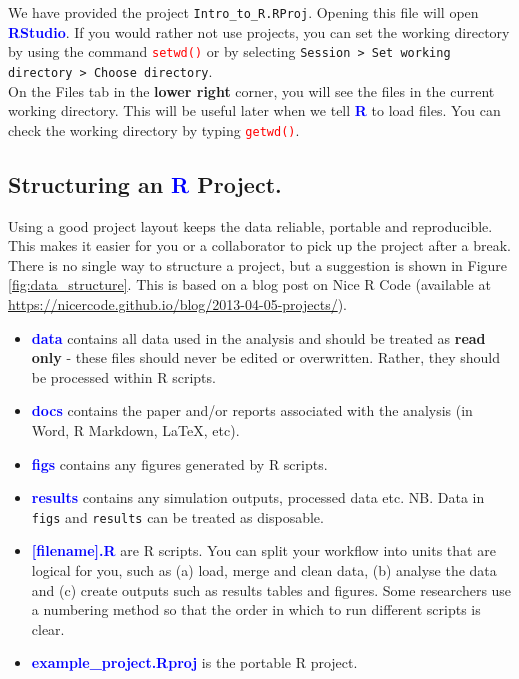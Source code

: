 \documentclass[a4paper,12pt]{article}
\newcommand\boldblue[1]{\textcolor{blue}{\textbf{#1}}}
\newcommand\code[1]{\textcolor{red}{\texttt{#1}}}
\begin{document}
We have provided the project \texttt{Intro\_to\_R.RProj}. Opening this file will open \boldblue{RStudio}. If you would rather not use projects, you can set the working directory by using the command \code{setwd()} or by selecting \texttt{Session > Set working directory > Choose directory}. \\

On the Files tab in the \textbf{lower right} corner, you will see the files in the current working directory. This will be useful later when we tell \boldblue{R} to load files. You can check the working directory by typing \code{getwd()}.


\subsection {Structuring an \boldblue{R} Project.}

Using a good project layout keeps the data reliable, portable and reproducible. This makes it easier for you or a collaborator to pick up the project after a break. There is no single way to structure a project, but a suggestion is shown in Figure \ref{fig:data_structure}. This is based on a blog post on Nice R Code (available at \url{https://nicercode.github.io/blog/2013-04-05-projects/}).

\begin{itemize}
\item \boldblue{data} contains all data used in the analysis and should be treated as \textbf{read only} - these files should never be edited or overwritten. Rather, they should be processed within R scripts.
\item \boldblue{docs} contains the paper and/or reports associated with the analysis (in Word, R Markdown, \LaTeX, etc).
\item \boldblue{figs} contains any figures generated by R scripts.
\item \boldblue{results} contains any simulation outputs, processed data etc. NB. Data in \texttt{figs} and \texttt{results} can be treated as disposable.
\item \boldblue{[filename].R} are R scripts. You can split your workflow into units that are logical for you, such as (a) load, merge and clean data, (b) analyse the data and (c) create outputs such as results tables and figures. Some researchers use a numbering method so that the order in which to run different scripts is clear. 
\item \boldblue{example\_project.Rproj} is the portable R project.

\end{itemize}
\end{document}
